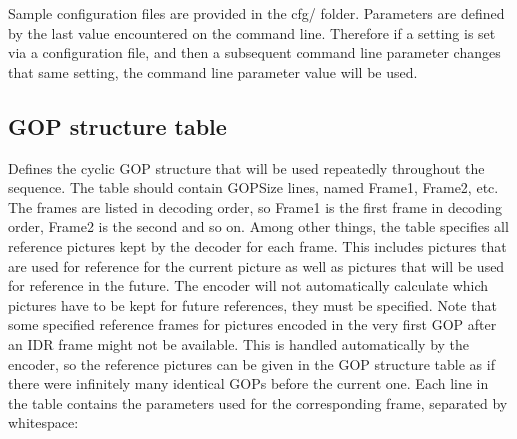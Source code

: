 \documentclass[a4paper,11pt]{jvetdoc}
\begin{document}
Sample configuration files are provided in the cfg/ folder.
Parameters are defined by the last value encountered on the command line.
Therefore if a setting is set via a configuration file, and then a subsequent
command line parameter changes that same setting, the command line parameter
value will be used.

\subsection{GOP structure table}
\label{sec:gop-structure}
Defines the cyclic GOP structure that will be used repeatedly
throughout the sequence. The table should contain GOPSize lines,
named Frame1, Frame2, etc. The frames are listed in decoding
order, so Frame1 is the first frame in decoding order, Frame2 is
the second and so on. Among other things, the table specifies all
reference pictures kept by the decoder for each frame. This
includes pictures that are used for reference for the current
picture as well as pictures that will be used for reference in
the future. The encoder will not automatically calculate which
pictures have to be kept for future references, they must
be specified. Note that some specified reference frames for
pictures encoded in the very first GOP after an IDR frame might
not be available. This is handled automatically by the encoder,
so the reference pictures can be given in the GOP structure table
as if there were infinitely many identical GOPs before the
current one. Each line in the table contains the parameters used
for the corresponding frame, separated by whitespace:
\end{document}
